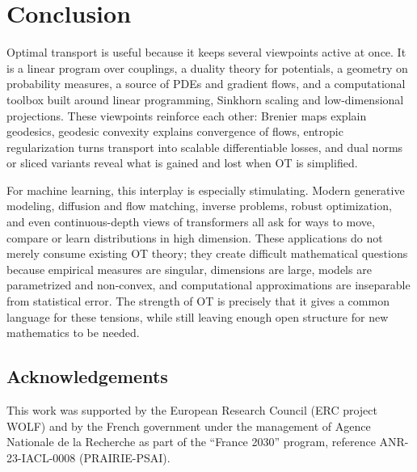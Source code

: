 \documentclass[10pt,a4paper,twoside,openany]{book}
\begin{document}
\mainmatter
















\chapter*{Conclusion}

Optimal transport is useful because it keeps several viewpoints active at once. It is a linear program over couplings, a duality theory for potentials, a geometry on probability measures, a source of PDEs and gradient flows, and a computational toolbox built around linear programming, Sinkhorn scaling and low-dimensional projections. These viewpoints reinforce each other: Brenier maps explain geodesics, geodesic convexity explains convergence of flows, entropic regularization turns transport into scalable differentiable losses, and dual norms or sliced variants reveal what is gained and lost when OT is simplified.

For machine learning, this interplay is especially stimulating. Modern generative modeling, diffusion and flow matching, inverse problems, robust optimization, and even continuous-depth views of transformers all ask for ways to move, compare or learn distributions in high dimension. These applications do not merely consume existing OT theory; they create difficult mathematical questions because empirical measures are singular, dimensions are large, models are parametrized and non-convex, and computational approximations are inseparable from statistical error. The strength of OT is precisely that it gives a common language for these tensions, while still leaving enough open structure for new mathematics to be needed.

\section*{Acknowledgements}

This work was supported by the European Research Council (ERC project WOLF) and by the French government under the management of Agence Nationale de la Recherche as part of the ``France 2030'' program, reference ANR-23-IACL-0008 (PRAIRIE-PSAI).





\clearpage
\appendix


\cleardoublepage
{}
{}
\printindex
\end{document}
